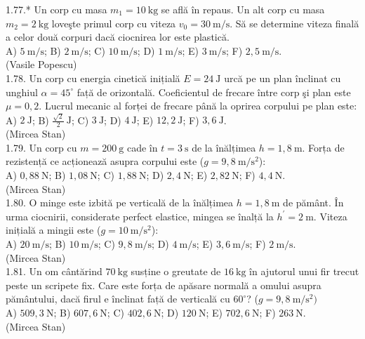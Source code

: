 \documentclass[10pt]{article}
\begin{document}
1.77.* Un corp cu masa $m_{1}=10 \mathrm{~kg}$ se află în repaus. Un alt corp cu masa $m_{2}=2 \mathrm{~kg}$ loveşte primul corp cu viteza $v_{0}=30 \mathrm{~m} / \mathrm{s}$. Să se determine viteza finală a celor două corpuri dacă ciocnirea lor este plastică.\\ A) $5 \mathrm{~m} / \mathrm{s}$; B) $2 \mathrm{~m} / \mathrm{s}$; C) $10 \mathrm{~m} / \mathrm{s}$; D) $1 \mathrm{~m} / \mathrm{s}$; E) $3 \mathrm{~m} / \mathrm{s}$; F) $2,5 \mathrm{~m} / \mathrm{s}$.\\ (Vasile Popescu)\\

1.78. Un corp cu energia cinetică inițială $E=24 \mathrm{~J}$ urcă pe un plan înclinat cu unghiul $\alpha=45^{\circ}$ față de orizontală. Coeficientul de frecare între corp şi plan este $\mu=0,2$. Lucrul mecanic al forței de frecare până la oprirea corpului pe plan este:\\ A) $2 \mathrm{~J}$; B) $\frac{\sqrt{2}}{2} \mathrm{~J}$; C) $3 \mathrm{~J}$; D) $4 \mathrm{~J}$; E) $12,2 \mathrm{~J}$; F) $3,6 \mathrm{~J}$.\\ (Mircea Stan)\\

1.79. Un corp cu $m=200 \mathrm{~g}$ cade în $t=3 \mathrm{~s}$ de la înălțimea $h=1,8 \mathrm{~m}$. Forța de rezistență ce acționează asupra corpului este ($g=9,8 \mathrm{~m} / \mathrm{s}^{2}$):\\ A) $0,88 \mathrm{~N}$; B) $1,08 \mathrm{~N}$; C) $1,88 \mathrm{~N}$; D) $2,4 \mathrm{~N}$; E) $2,82 \mathrm{~N}$; F) $4,4 \mathrm{~N}$.\\ (Mircea Stan)\\

1.80. O minge este izbită pe verticală de la înălțimea $h=1,8 \mathrm{~m}$ de pământ. În urma ciocnirii, considerate perfect elastice, mingea se înalță la $h^{\prime}=2 \mathrm{~m}$. Viteza inițială a mingii este ($g=10 \mathrm{~m} / \mathrm{s}^{2}$):\\ A) $20 \mathrm{~m} / \mathrm{s}$; B) $10 \mathrm{~m} / \mathrm{s}$; C) $9,8 \mathrm{~m} / \mathrm{s}$; D) $4 \mathrm{~m} / \mathrm{s}$; E) $3,6 \mathrm{~m} / \mathrm{s}$; F) $2 \mathrm{~m} / \mathrm{s}$.\\ (Mircea Stan)\\

1.81. Un om cântărind $70 \mathrm{~kg}$ susține o greutate de $16 \mathrm{~kg}$ în ajutorul unui fir trecut peste un scripete fix. Care este forța de apăsare normală a omului asupra pământului, dacă firul e înclinat față de verticală cu $60^{\circ}$? ($g=9,8 \mathrm{~m} / \mathrm{s}^{2})$\\ A) $509,3 \mathrm{~N}$; B) $607,6 \mathrm{~N}$; C) $402,6 \mathrm{~N}$; D) $120 \mathrm{~N}$; E) $702,6 \mathrm{~N}$; F) $263 \mathrm{~N}$.\\ (Mircea Stan)\\
\end{document}
